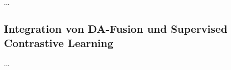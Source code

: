 ...

\subsection{Integration von DA-Fusion und Supervised Contrastive Learning} \label{subsec-da-fusion-scl}


...